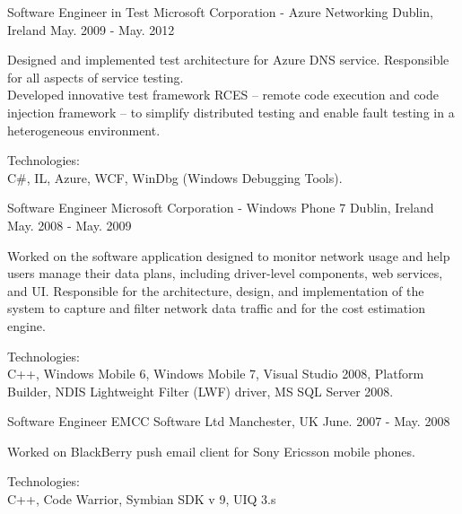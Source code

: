 \begin{cventries}

\cventry
{Software Engineer in Test} %
{Microsoft Corporation - Azure Networking} %
{Dublin, Ireland} %
{May. 2009 - May. 2012} %
{
  \begin{cvitems} %
    \item
    {
      Designed and implemented test architecture for Azure DNS service.
      Responsible for all aspects of service testing. \\
      Developed innovative test framework RCES – remote code execution and code injection framework – 
      to simplify distributed testing and enable fault testing in a heterogeneous environment.
    }
    \item
    {
      Technologies: \\
      {C\#}, IL, Azure, WCF, WinDbg (Windows Debugging Tools).
    }
  \end{cvitems}
}

\cventry
{Software Engineer} %
{Microsoft Corporation - Windows Phone 7} %
{Dublin, Ireland} %
{May. 2008 - May. 2009} %
{
  \begin{cvitems} %
    \item
    {
      Worked on the software application designed to monitor network usage and help users manage their data plans, including driver-level components, web services, and UI.
      Responsible for the architecture, design, and implementation of the system to capture and filter network data traffic and for the cost estimation engine.
    }
    \item
    {
      Technologies:\\
      C++, Windows Mobile 6, Windows Mobile 7, Visual Studio 2008, Platform Builder, NDIS Lightweight Filter (LWF) driver, MS SQL Server 2008.
    }
  \end{cvitems}
}

\cventry
{Software Engineer} %
{EMCC Software Ltd} %
{Manchester, UK} %
{June. 2007 - May. 2008} %
{
  \begin{cvitems} %
    \item
    {
      Worked on BlackBerry push email client for Sony Ericsson mobile phones.
    }
    \item
    {
      Technologies:\\
      C++, Code Warrior, Symbian SDK v 9, UIQ 3.s
    }
  \end{cvitems}
}


\end{cventries}

